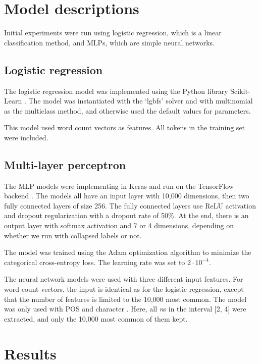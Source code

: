 \section{Model descriptions}

Initial experiments were run using logistic regression, which is a linear
classification method, and \acp{MLP}, which are simple neural networks.

\subsection{Logistic regression}

The logistic regression model was implemented using the Python library
Scikit-Learn \autocite{scikit-learn}. The model was instantiated with the
`lgbfs' solver and with multinomial as the multiclass method, and otherwise
used the default values for parameters.

This model used word count vectors as features. All tokens in the training set
were included.

\subsection{Multi-layer perceptron}
\label{subsec:mlp}

The MLP models were implementing in Keras \autocite{keras} and run on the
TensorFlow backend \autocite{tensorflow}. The models all have an input layer
with 10,000 dimensions, then two fully connected layers of size 256. The
fully connected layers use \ac{ReLU} activation and dropout regularization
with a dropout rate of 50\%. At the end, there is an output layer with
softmax activation and 7 or 4 dimensions, depending on whether we run with
collapsed labels or not.

The model was trained using the Adam optimization algorithm to minimize the
categorical cross-entropy loss. The learning rate was set to $2\cdot
10^{-4}$.

The neural network models were used with three different input features. For
word count vectors, the input is identical as for the logistic regression,
except that the number of features is limited to the 10,000 most common. 
The model was only used with \ac{POS} and character \ngrams. Here, all 
\textit{n}s in the interval [2, 4] were extracted, and only the 10,000 most
common of them kept.

\section{Results}

